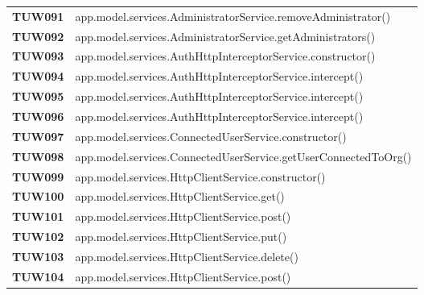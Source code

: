 \documentclass[../../piano-di-qualifica.tex]{subfiles}
\begin{document}
\begin{longtable}[H]{>{\centering\bfseries}m{3cm} >{}m{13cm}}
TUW091             & app.model.services.AdministratorService.removeAdministrator\@()\\ 

TUW092            & app.model.services.AdministratorService.getAdministrators\@()\\ 



TUW093             & app.model.services.AuthHttpInterceptorService.constructor\@()\\ 

TUW094             & app.model.services.AuthHttpInterceptorService.intercept\@()\\ 
 
TUW095            & app.model.services.AuthHttpInterceptorService.intercept\@()\\ 

TUW096             & app.model.services.AuthHttpInterceptorService.intercept\@()\\ 




TUW097             & app.model.services.ConnectedUserService.constructor\@()\\ 

TUW098             & app.model.services.ConnectedUserService.getUserConnectedToOrg\@()\\ 
 


TUW099             & app.model.services.HttpClientService.constructor\@()\\ 

TUW100              & app.model.services.HttpClientService.get\@()\\ 

TUW101              & app.model.services.HttpClientService.post\@()\\ 

TUW102              & app.model.services.HttpClientService.put\@()\\ 

TUW103              & app.model.services.HttpClientService.delete\@()\\ 

TUW104              & app.model.services.HttpClientService.post\@()\\ 





\end{longtable}
\end{document}
